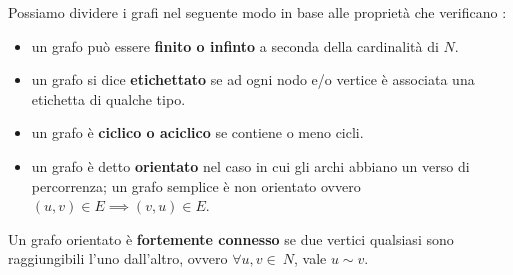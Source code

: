Possiamo dividere i grafi nel seguente modo in base alle proprietà che verificano :

\begin{itemize}
\item un grafo può essere \textbf{finito o infinto} a seconda della cardinalità di $N$.
\item un grafo si dice \textbf{etichettato} se ad ogni nodo e/o vertice è associata una etichetta di qualche tipo.
\item un grafo è \textbf{ciclico o aciclico} se contiene o meno cicli.
\item un grafo è detto \textbf{orientato} nel caso in cui gli archi abbiano un verso di percorrenza; un grafo semplice è non orientato ovvero $(u,v)\in E \implies (v,u) \in E$.
\end{itemize}

\begin{definition}
Un grafo orientato è \textbf{fortemente connesso} se due vertici qualsiasi sono raggiungibili l'uno dall'altro, ovvero $\forall u, v \in \: N $, vale $ u \sim v $.
\end{definition}

